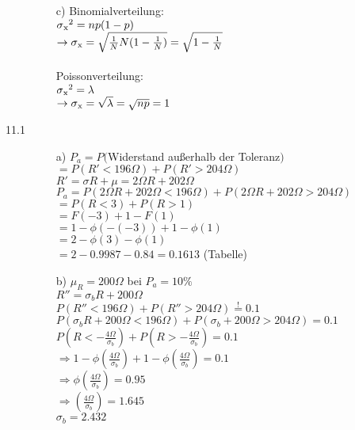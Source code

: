 \documentclass[a4paper]{article}
\begin{document}
\begin{description}
\begin{itemize}
			\item[c)] Binomialverteilung:\\ 
								$\sigma \textsubscript{x}\textsuperscript{2}= np(1-p)$\\
								$\rightarrow \sigma \textsubscript{x}= \sqrt{\frac{1}{N}N(1-\frac{1}{N})} = \sqrt{1-\frac{1}{N}}$\\
								\\
								Poissonverteilung:\\
								$\sigma \textsubscript{x}\textsuperscript{2}= \lambda$\\
								$\rightarrow \sigma \textsubscript{x}= \sqrt{\lambda} = \sqrt{np} = 1$\\
		\end{itemize}
	

\item[11.1] 
	\begin{itemize}
		\item[a)]	$P_a= P($Widerstand außerhalb der Toleranz$)$\\
							$=P(R'<196\Omega) + P(R'>204\Omega)$\\
							$R'= \sigma R + \mu = 2\Omega R + 202\Omega$\\
						
							$P_a= P(2\Omega R + 202\Omega < 196\Omega) + P(2\Omega R + 202\Omega > 204\Omega)$\\
							$=P(R<3) + P(R>1)$\\
							$=F(-3) + 1-F(1)$\\
							$=1-\phi(-(-3))+1-\phi (1)$\\
							$=2-\phi (3) -\phi(1)$\\
							$=2-0.9987-0.84=0.1613$ (Tabelle)\\
\newpage
		\item[b)] $\mu_R=200\Omega$ bei $P_a= 10\%$\\
							$R''=\sigma_b R+200\Omega$\\
							
							$P(R''< 196\Omega) + P(R'' > 204\Omega) \stackrel{!}{=}0.1$\\
							$P(\sigma_b R +200\Omega <196\Omega) + P(\sigma_b +200\Omega > 204\Omega) =0.1$\\
							$P(R< -\frac{4\Omega}{\sigma_b}) + P(R> -\frac{4\Omega}{\sigma_b})=0.1$\\
							$\Rightarrow 1-\phi (\frac{4\Omega}{\sigma_b}) + 1 -\phi (\frac{4\Omega}{\sigma_b})=0.1$\\
							$\Rightarrow \phi (\frac{4\Omega}{\sigma_b}) =0.95$\\
							$\Rightarrow (\frac{4\Omega}{\sigma_b})=1.645$\\
							$\sigma_b = 2.432$\\
							

\end{itemize}
\end{description}
\end{document}
